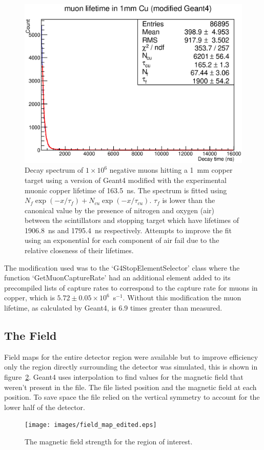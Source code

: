 \begin{figure}[hptb]
  \centering
    \includegraphics[width=.8\textwidth]{images/mu-_lifetime_in_cu_modded_g4.eps}
  \caption{Decay spectrum of \(1\times10^6\) negative muons hitting a 1~mm copper target using a version of Geant4 modified with the experimental muonic copper lifetime of 163.5~ns. The spectrum is fitted using \(N_f\exp(-x/\tau_f) +  N_{cu}\exp(-x/\tau_{cu})\). \(\tau_f\) is lower than the canonical value by the presence of nitrogen and oxygen (air) between the scintillators and stopping target which have lifetimes of 1906.8~ns and 1795.4~ns respectively. Attempts to improve the fit using an exponential for each component of air fail due to the relative closeness of their lifetimes.}
  \label{fig:images_mu-_lifetime_in_cu_modded_g4}
\end{figure}

The modification used was to the `G4StopElementSelector' class where the function `GetMuonCaptureRate' had an additional element added to its precompiled lists of capture rates to correspond to the capture rate for muons in copper, which is \(5.72\pm0.05\times10^6\)~s\(^{-1}\). Without this modification the muon lifetime, as calculated by Geant4, is 6.9 times greater than measured.

\subsection{The Field} %
\label{sec:the_field}
Field maps for the entire detector region were available but to improve efficiency only the region directly surrounding the detector was simulated, this is shown in figure~\ref{fig:images_field_map_edited}. Geant4 uses interpolation to find values for the magnetic field that weren't present in the file. The file listed position and the magnetic field at each position. To save space the file relied on the vertical symmetry to account for the lower half of the detector. 
\begin{figure}[hptb]
  \centering
    \texttt{[image: images/field\_map\_edited.eps]}
  \caption{The magnetic field strength for the region of interest.}
  \label{fig:images_field_map_edited}
\end{figure}

